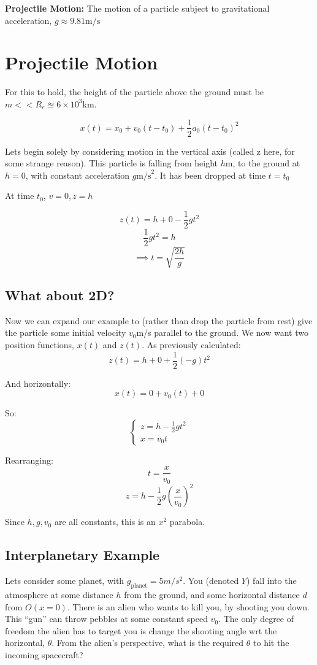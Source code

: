 
\textbf{Projectile Motion: } The motion of a particle subject to gravitational acceleration, $g \approx 9.81 \text{m/s}$

\section{Projectile Motion}

For this to hold, the height of the particle above the ground must be $m << R_e \approxeq 6 \times 10^3$km.

\[
    x(t) = x_0 + v_0(t - t_0) + \frac{1}{2} a_0 (t-t_0)^2
\]

Lets begin solely by considering motion in the vertical axis (called z here, for some strange reason). This particle is falling from height $h$m, to the ground at $h = 0$, with constant acceleration $g \text{m/s}^2$. It has been dropped at time $t = t_0$

At time $t_0$, $v = 0, z = h$

\[
    z(t) = h + 0 - \frac{1}{2}gt^2
\]
\[
    \frac{1}{2}gt^2 = h
\]
\[
    \implies t = \sqrt{\frac{2h}{g}}
\]

\subsection{What about 2D?}
Now we can expand our example to (rather than drop the particle from rest) give the particle some initial velocity $v_0$m/s parallel to the ground. We now want two position functions, $x(t)$ and $z(t)$. As previously calculated:
\[
    z(t) = h + 0 + \frac{1}{2}(-g)t^2
\]

And horizontally:
\[
    x(t) = 0 + v_0(t) + 0
\]

So:
\[
    \begin{cases}
    z = h - \frac{1}{2}gt^2 \\
    x = v_0 t
    \end{cases}
\]

Rearranging:
\[
    t = \frac{x}{v_0}
\]
\[
    z = h - \frac{1}{2}g\left(\frac{x}{v_0}\right)^2
\]

Since $h, g, v_0$ are all constants, this is an $x^2$ parabola.

\subsection{Interplanetary Example}
Lets consider some planet, with $g_{\text{planet}} = 5m/s^2$. You (denoted $Y$) fall into the atmosphere at some distance $h$ from the ground, and some horizontal distance $d$ from $O (x = 0)$. There is an alien who wants to kill you, by shooting you down. This ``gun'' can throw pebbles at some constant speed $v_0$. The only degree of freedom the alien has to target you is change the shooting angle wrt the horizontal, $\theta$. From the alien's perspective, what is the required $\theta$ to hit the incoming spacecraft?


